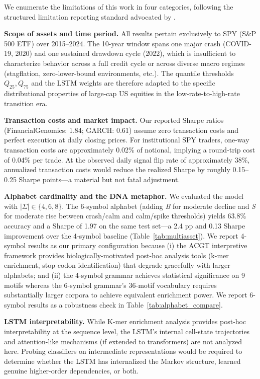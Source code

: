 \documentclass[11pt]{article}
\begin{document}
We enumerate the limitations of this work in four categories,
following the structured limitation reporting standard advocated by
\citet{bender2021dangers}.

\textbf{Scope of assets and time period.}  All results pertain
exclusively to SPY (S\&P 500 ETF) over 2015--2024.  The 10-year
window spans one major crash (COVID-19, 2020) and one sustained
drawdown cycle (2022), which is insufficient to characterize behavior
across a full credit cycle or across diverse macro regimes (stagflation,
zero-lower-bound environments, etc.).  The quantile thresholds
$Q_{25}, Q_{75}$ and the LSTM weights are therefore adapted to the
specific distributional properties of large-cap US equities in the
low-rate-to-high-rate transition era.

\textbf{Transaction costs and market impact.}  Our reported Sharpe
ratios (FinancialGenomics: 1.84; GARCH: 0.61) assume zero transaction
costs and perfect execution at daily closing prices.  For institutional
SPY traders, one-way transaction costs are approximately 0.02\% of
notional, implying a round-trip cost of 0.04\% per trade.  At the
observed daily signal flip rate of approximately 38\%, annualized
transaction costs would reduce the realized Sharpe by roughly 0.15--0.25
Sharpe points---a material but not fatal adjustment.

\textbf{Alphabet cardinality and the DNA metaphor.} We evaluated the model with $|\Sigma| \in \{4, 6, 8\}$. The 6-symbol alphabet (adding \textit{B} for moderate decline and \textit{S} for moderate rise between crash/calm and calm/spike thresholds) yields 63.8\% accuracy and a Sharpe of 1.97 on the same test set---a 2.4 pp and 0.13 Sharpe improvement over the 4-symbol baseline (Table~\ref{tab:multiasset}). We report 4-symbol results as our primary configuration because (i) the ACGT interpretive framework provides biologically-motivated post-hoc analysis tools (k-mer enrichment, stop-codon identification) that degrade gracefully with larger alphabets; and (ii) the 4-symbol grammar achieves statistical significance on 9 motifs whereas the 6-symbol grammar's 36-motif vocabulary requires substantially larger corpora to achieve equivalent enrichment power. We report 6-symbol results as a robustness check in Table~\ref{tab:alphabet_compare}.

\textbf{LSTM interpretability.}  While K-mer enrichment analysis
provides post-hoc interpretability at the sequence level, the LSTM's
internal cell-state trajectories and attention-like mechanisms
(if extended to transformers) are not analyzed here.  Probing
classifiers \citep{alain2016understanding} on intermediate
representations would be required to determine whether the LSTM has
internalized the Markov structure, learned genuine higher-order
dependencies, or both.
\end{document}
